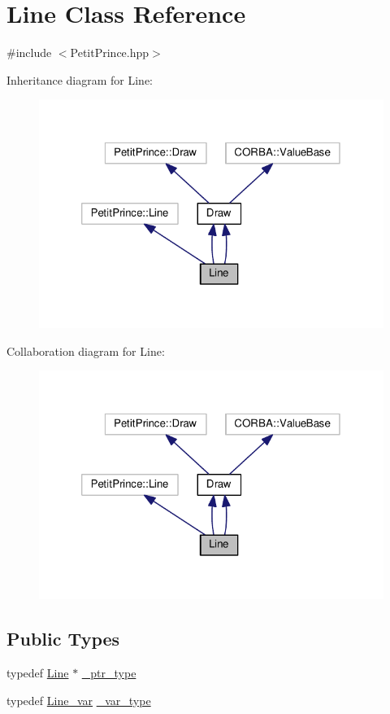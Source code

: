 \hypertarget{class_line}{}\section{Line Class Reference}
\label{class_line}


{\ttfamily \#include $<$Petit\+Prince.\+hpp$>$}



Inheritance diagram for Line\+:
\nopagebreak
\begin{figure}[H]
\begin{center}
\leavevmode
\includegraphics[width=320pt]{class_line__inherit__graph}
\end{center}
\end{figure}


Collaboration diagram for Line\+:
\nopagebreak
\begin{figure}[H]
\begin{center}
\leavevmode
\includegraphics[width=320pt]{class_line__coll__graph}
\end{center}
\end{figure}
\subsection*{Public Types}
\begin{DoxyCompactItemize}
\item 
typedef \hyperlink{class_line}{Line} $\ast$ \hyperlink{class_line_a886875fa295d09a973b952a38d791975}{\+\_\+ptr\+\_\+type}
\item 
typedef \hyperlink{_petit_prince_8hpp_a90bd71cc9b7ba07b75cd943d99dbc8a6}{Line\+\_\+var} \hyperlink{class_line_a65425cec92e3b0b955728581d07ac83b}{\+\_\+var\+\_\+type}
\end{DoxyCompactItemize}
